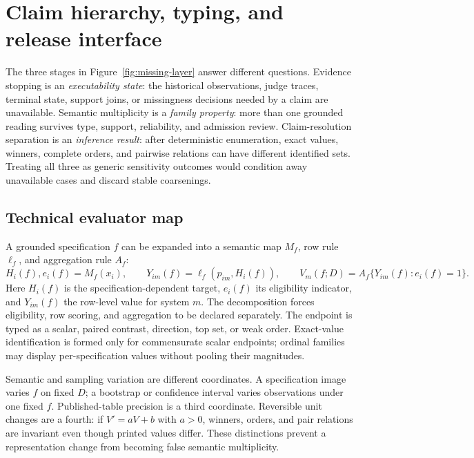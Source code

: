 \clearpage
\appendix
\raggedbottom
\small

\section{Claim hierarchy, typing, and release interface}
\label{app:reproducibility}

The three stages in Figure~\ref{fig:missing-layer} answer different questions.  Evidence stopping is an \emph{executability state}: the historical observations, judge traces, terminal state, support joins, or missingness decisions needed by a claim are unavailable.  Semantic multiplicity is a \emph{family property}: more than one grounded reading survives type, support, reliability, and admission review.  Claim-resolution separation is an \emph{inference result}: after deterministic enumeration, exact values, winners, complete orders, and pairwise relations can have different identified sets.  Treating all three as generic sensitivity outcomes would condition away unavailable cases and discard stable coarsenings.

\subsection{Technical evaluator map}
\label{app:technical-formalism}

A grounded specification \(f\) can be expanded into a semantic map \(M_f\), row rule \(\ell_f\), and aggregation rule \(A_f\):
\begin{equation}
  H_i(f),e_i(f)=M_f(x_i),\qquad
  Y_{im}(f)=\ell_f(p_{im},H_i(f)),\qquad
  V_m(f;D)=A_f\{Y_{im}(f):e_i(f)=1\}.
  \label{eq:appendix-spec-map}
\end{equation}
Here \(H_i(f)\) is the specification-dependent target, \(e_i(f)\) its eligibility indicator, and \(Y_{im}(f)\) the row-level value for system \(m\).  The decomposition forces eligibility, row scoring, and aggregation to be declared separately.  The endpoint is typed as a scalar, paired contrast, direction, top set, or weak order.  Exact-value identification is formed only for commensurate scalar endpoints; ordinal families may display per-specification values without pooling their magnitudes.

Semantic and sampling variation are different coordinates.  A specification image varies \(f\) on fixed \(D\); a bootstrap or confidence interval varies observations under one fixed \(f\).  Published-table precision is a third coordinate.  Reversible unit changes are a fourth: if \(V'=aV+b\) with \(a>0\), winners, orders, and pair relations are invariant even though printed values differ.  These distinctions prevent a representation change from becoming false semantic multiplicity.

